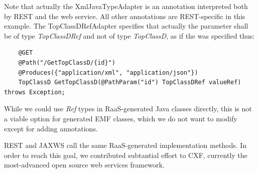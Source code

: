 \documentclass[11pt]{article}
\begin{document}
Note that actually the XmlJavaTypeAdapter is an annotation interpreted both by REST and the web service. All other annotations are REST-specific in this example. The TopClassDRefAdapter specifies that actually the parameter shall be of type {\em TopClassDRef} and not of type {\em TopClassD}, as if the was specified thus:

\begin{verbatim}
	@GET
	@Path("/GetTopClassD/{id}")
	@Produces({"application/xml", "application/json"})
	TopClassD GetTopClassD(@PathParam("id") TopClassDRef valueRef) throws Exception;
\end{verbatim}

While we could use {\em Ref} types in RaaS-generated Java classes directly, this is not a viable option for generated EMF classes, which we do not want to modify except for adding annotations.     

REST and JAXWS call the same RaaS-generated implementation methods. In order to reach this goal, we contributed subtantial effort to CXF,  currently the most-advanced open source web services framework. 
\end{document}
